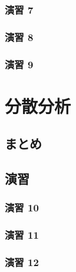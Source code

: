 \documentclass[
  12pt,
]{book}
\begin{document}
\hypertarget{ux6f14ux7fd2-7-1}{%
\subsubsection*{演習 7}\label{ux6f14ux7fd2-7-1}}

\hypertarget{ux6f14ux7fd2-8}{%
\subsubsection*{演習 8}\label{ux6f14ux7fd2-8}}

\hypertarget{ux6f14ux7fd2-9}{%
\subsubsection*{演習 9}\label{ux6f14ux7fd2-9}}

\hypertarget{ux5206ux6563ux5206ux6790}{%
\section{分散分析}\label{ux5206ux6563ux5206ux6790}}

\hypertarget{ux307eux3068ux3081-3}{%
\subsection{まとめ}\label{ux307eux3068ux3081-3}}

\hypertarget{ux6f14ux7fd2-10}{%
\subsection{演習}\label{ux6f14ux7fd2-10}}

\hypertarget{ux6f14ux7fd2-10-1}{%
\subsubsection*{演習 10}\label{ux6f14ux7fd2-10-1}}

\hypertarget{ux6f14ux7fd2-11}{%
\subsubsection*{演習 11}\label{ux6f14ux7fd2-11}}

\hypertarget{ux6f14ux7fd2-12}{%
\subsubsection*{演習 12}\label{ux6f14ux7fd2-12}}
\end{document}
